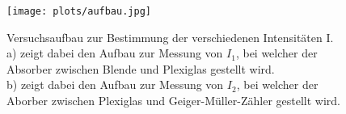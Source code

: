 \begin{figure}[H]
    \centering
    \texttt{[image: plots/aufbau.jpg]}
    \caption{Versuchsaufbau zur Bestimmung der verschiedenen Intensitäten I.\\
        a) zeigt dabei den Aufbau zur Messung von $I_1$, bei welcher der Absorber zwischen 
        Blende und Plexiglas gestellt wird.\\
        b) zeigt dabei den Aufbau zur Messung von $I_2$, bei welcher der Aborber zwischen
        Plexiglas und Geiger-Müller-Zähler gestellt wird.
    }
\end{figure}
\label{sec:Durchfuehrung}

